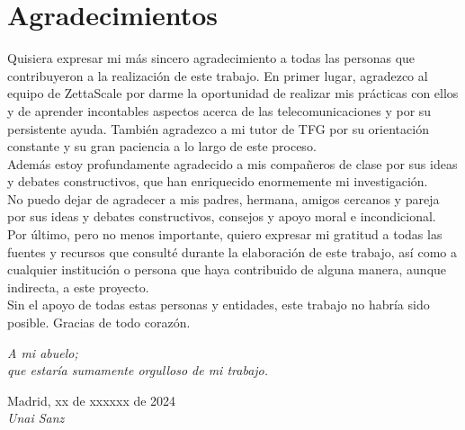 \cleardoublepage

\chapter*{Agradecimientos}

Quisiera expresar mi más sincero agradecimiento a todas las personas que
contribuyeron a la realización de este trabajo. En primer lugar, agradezco al
equipo de ZettaScale por darme la oportunidad de realizar mis prácticas con
ellos y de aprender incontables aspectos acerca de las telecomunicaciones y por
su persistente ayuda. También agradezco a mi tutor de TFG por su orientación
constante y su gran paciencia a lo largo de este proceso.\\

Además estoy profundamente agradecido a mis compañeros de clase por sus ideas y
debates constructivos, que han enriquecido enormemente mi investigación.\\

No puedo dejar de agradecer a mis padres, hermana, amigos cercanos y pareja por
sus ideas y debates constructivos, consejos y apoyo moral e incondicional.\\

Por último, pero no menos importante, quiero expresar mi gratitud a todas las
fuentes y recursos que consulté durante la elaboración de este trabajo, así como
a cualquier institución o persona que haya contribuido de alguna manera, aunque
indirecta, a este proyecto.\\

Sin el apoyo de todas estas personas y entidades, este trabajo no habría sido
posible. Gracias de todo corazón.\\


\begin{flushright}
		\vspace{1.5 cm}
		\emph{A mi abuelo;\\
      		  que estaría sumamente orgulloso de mi trabajo.}\\
		\par
		\vspace{1.0 cm}
		Madrid, xx de xxxxxx de 2024\\ %
		\emph{Unai Sanz}
\end{flushright}

\thispagestyle{empty}

